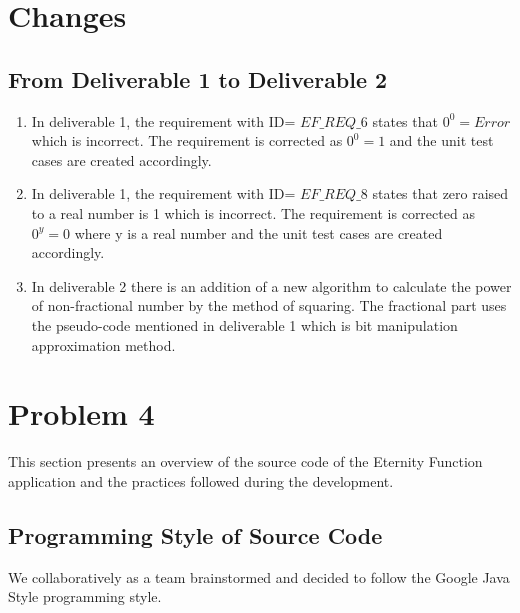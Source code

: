 \documentclass[11pt, english]{report}
\begin{document}
\newcommand{\CC}{C\nolinebreak\hspace{-.05em}\raisebox{.4ex}{\tiny\bf +}\nolinebreak\hspace{-.10em}\raisebox{.4ex}{\tiny\bf +}}
\def\CC{{C\nolinebreak[4]\hspace{-.05em}\raisebox{.4ex}{\tiny\bf ++}}}

\tableofcontents
\newpage
\chapter{Changes}

\section{From Deliverable 1 to Deliverable 2}

\begin{enumerate}
    \item In deliverable 1, the requirement with ID= $EF\_REQ\_6$ states that $0^0=Error$ which is incorrect. The requirement is corrected as $0^0=1$ and the unit test cases are created accordingly.
    \item In deliverable 1, the requirement with ID= $EF\_REQ\_8$ states that zero raised to a real number is 1 which is incorrect. The requirement is corrected as $0^y=0$ where y is a real number and the unit test cases are created accordingly.
    \item In deliverable 2 there is an addition of a new algorithm to calculate the power of non-fractional number by the method of squaring. The fractional part uses the pseudo-code mentioned in deliverable 1 which is bit manipulation approximation method.
\end{enumerate}

\chapter{Problem 4}

This section presents an overview of the source code of the Eternity Function application and the practices followed during the development.

\section{Programming Style of Source Code}

We collaboratively as a team brainstormed and decided to follow the Google Java Style\cite{googlestyle} programming style. 
\end{document}
